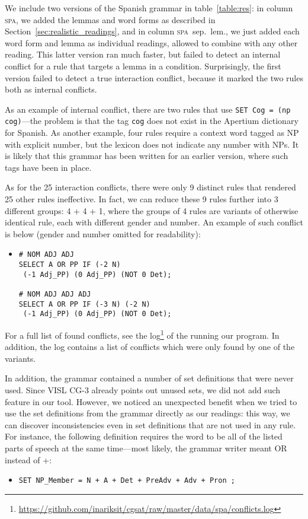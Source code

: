 We include two versions of the Spanish grammar in table~\ref{table:res}: in column \textsc{spa}, we added the lemmas and word forms as described in Section~\ref{sec:realistic_readings}, and in column \textsc{spa}~{\small sep.~lem.}, we just added each word form and lemma as individual readings, allowed to combine with any other reading. 
This latter version ran much faster, but failed to detect an internal conflict for a rule that targets a lemma in a condition.
Surprisingly, the first version failed to detect a true interaction conflict, because it marked the two rules both as internal conflicts.

As an example of internal conflict, there are two rules that use \texttt{SET Cog = (np cog)}---the problem is that the tag \texttt{cog} does not exist in the Apertium dictionary for Spanish. As another example, four rules require a context word tagged as NP with explicit number, but the lexicon does not indicate any number with NPs. It is likely that this grammar has been written for an earlier version, where such tags have been in place.

As for the 25 interaction conflicts, there were only 9 distinct rules that rendered 25 other rules ineffective.
In fact, we can reduce these 9 rules further into 3 different groups: 4 + 4 + 1, where the groups of 4 rules are variants of otherwise identical rule, each with different gender and number.
An example of such conflict is below (gender and number omitted for readability):

\begin{itemize}
\item[] 
\begin{verbatim}
# NOM ADJ ADJ
SELECT A OR PP IF (-2 N) 
 (-1 Adj_PP) (0 Adj_PP) (NOT 0 Det);

# NOM ADJ ADJ ADJ
SELECT A OR PP IF (-3 N) (-2 N) 
 (-1 Adj_PP) (0 Adj_PP) (NOT 0 Det);
\end{verbatim}
\end{itemize}


For a full list of found conflicts, see the log\footnote{\url{https://github.com/inariksit/cgsat/raw/master/data/spa/conflicts.log}} of the running our program. 
In addition, the log contains a list of conflicts which were only found by one of the variants.

In addition, the grammar contained a number of set definitions that were never
used. Since VISL CG-3 already points out unused sets, we did not add such
feature in our tool. However, we noticed an unexpected benefit when
we tried to use the set definitions from the grammar directly as our
readings: this way, we can discover inconsistencies even in
set definitions that are not used in any rule.
For instance, the following definition requires the word to be all of
the listed parts of speech at the same time---most likely, the grammar writer meant 
OR instead of +:
\begin{itemize}
\item[] 
\texttt{SET NP\_Member = N + A + Det + PreAdv + Adv + Pron ;}
\end{itemize}

